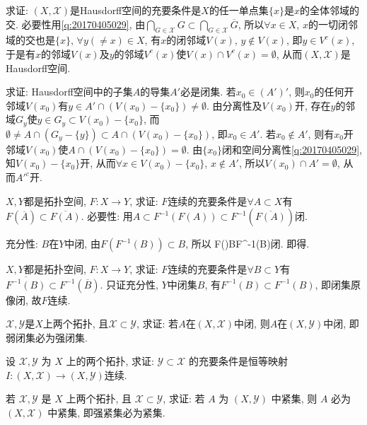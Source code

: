 \bq{}{}
求证: $(X, \mathscr{X})$是Hausdorff空间的充要条件是$X$的任一单点集$\{x\}$是$x$的全体邻域的交.
\eq
\ba
必要性用\ref{q:20170405029}, 由$\bigcap_{G\in\mathscr{X}}G\subset\bigcap_{G\in\mathscr{X}}\overline{G}$, 所以$\forall x\in X$, $x$的一切闭邻域的交也是$\{x\}$, 
$\forall y(\ne x)\in X$, 有$x$的闭邻域$V(x)$, $y\notin V(x)$, 即$y\in V^c(x)$, 于是有$x$的邻域$V(x)$及$y$的邻域$V^c(x)$使$V(x)\cap V^c(x)=\emptyset$, 
从而$(X, \mathscr{X})$是Hausdorff空间.
\ea

\bq{}{}
求证: Hausdorff空间中的子集$A$的导集$A'$必是闭集.
\eq
\ba
若$x_0\in(A')'$, 则$x_0$的任何开邻域$V(x_0)$有$y\in A'\cap(V(x_0)-\{x_0\})\ne\emptyset$. 由分离性及$V(x_0)$开, 存在$y$的邻域$G_y$使$y\in G_y\subset V(x_0)-\{x_0\}$,
而$\emptyset\ne A\cap(G_y-\{y\})\subset A\cap(V(x_0)-\{x_0\})$, 即$x_0\in A'$.
\ea
\ba
若$x_0\notin A'$, 则有$x_0$开邻域$V(x_0)$使$A\cap(V(x_0)-\{x_0\})=\emptyset$. 由$\{x_0\}$闭和空间分离性\ref{q:20170405029}, 知$V(x_0)-\{x_0\}$开,
从而$\forall x\in V(x_0)-\{x_0\}$, $x\notin A'$, 所以$V(x_0)\cap A'=\emptyset$, 从而$A'^c$开.
\ea

\bq{}{}
$X, Y$都是拓扑空间, $F: X\to Y$, 求证: $F$连续的充要条件是$\forall A\subset X$有$F(\overline{A})\subset\overline{F(A)}$.
\eq
\ba
必要性: 用$A\subset F^{-1}(F(A))\subset F^{-1}(\overline{F(A)})$闭.

充分性: $B$在$Y$中闭, 由$F(F^{-1}(B))\subset B$, 所以
\bee
F()\subset {}\subset B\Longrightarrow {}\subset F^{-1}(B)\textrm{闭}.
\eee
即得.
\ea

\bq{}{}
$X, Y$都是拓扑空间, $F: X\to Y$, 求证: $F$连续的充要条件是$\forall B\subset Y$有$\overline{F^{-1}(B)}\subset F^{-1}(\overline{B})$.
\eq
\ba
只证充分性, $Y$中闭集$B$, 有$\overline{F^{-1}(B)}\subset F^{-1}(B)$, 即闭集原像闭, 故$F$连续.
\ea

\bq{}{}
$\mathscr{X}, \mathscr{Y}$是$X$上两个拓扑, 且$\mathscr{X}\subset\mathscr{Y}$, 求证: 若$A$在$(X, \mathscr{X})$中闭, 则$A$在$(X, \mathscr{Y})$中闭,
即弱闭集必为强闭集.
\eq

\bq{}{}
设 $\mathscr{X}, \mathscr{Y}$ 为 $X$ 上的两个拓扑, 求证: $\mathscr{Y}\subset\mathscr{X}$ 的充要条件是恒等映射 $I: (X,\mathscr{X})\to(X,\mathscr{Y})$连续.
\eq

\bq{}{}
若 $\mathscr{X}, \mathscr{Y}$ 是 $X$ 上两个拓扑, 且 $\mathscr{X}\subset\mathscr{Y}$, 求证: 若 $A$ 为 $(X,\mathscr{Y})$ 中紧集, 则 $A$ 必为 $(X,\mathscr{X})$ 中紧集,
即强紧集必为紧集.
\eq

